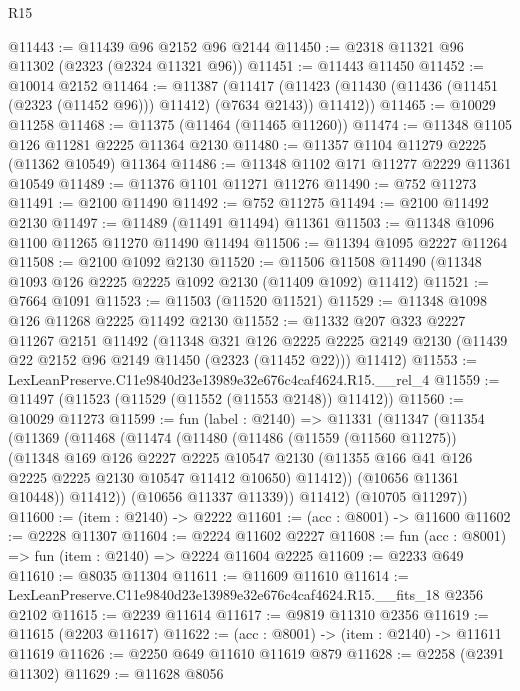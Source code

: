 \begin{lexlean}{R15}
\begin{coremodule}
@11443 := @11439 @96 @2152 @96 @2144
@11450 := @2318 @11321 @96 @11302 (@2323 (@2324 @11321 @96))
@11451 := @11443 @11450
@11452 := @10014 @2152
@11464 := @11387
    (@11417 (@11423 (@11430 (@11436 (@11451 (@2323 (@11452 @96))) @11412) (@7634 @2143)) @11412))
@11465 := @10029 @11258
@11468 := @11375 (@11464 (@11465 @11260))
@11474 := @11348 @1105 @126 @11281 @2225 @11364 @2130
@11480 := @11357 @1104 @11279 @2225 (@11362 @10549) @11364
@11486 := @11348 @1102 @171 @11277 @2229 @11361 @10549
@11489 := @11376 @1101 @11271 @11276
@11490 := @752 @11273
@11491 := @2100 @11490
@11492 := @752 @11275
@11494 := @2100 @11492 @2130
@11497 := @11489 (@11491 @11494) @11361
@11503 := @11348 @1096 @1100 @11265 @11270 @11490 @11494
@11506 := @11394 @1095 @2227 @11264
@11508 := @2100 @1092 @2130
@11520 := @11506 @11508 @11490 (@11348 @1093 @126 @2225 @2225 @1092 @2130 (@11409 @1092) @11412)
@11521 := @7664 @1091
@11523 := @11503 (@11520 @11521)
@11529 := @11348 @1098 @126 @11268 @2225 @11492 @2130
@11552 := @11332
    @207
    @323
    @2227
    @11267
    @2151
    @11492
    (@11348
      @321
      @126
      @2225
      @2225
      @2149
      @2130
      (@11439 @22 @2152 @96 @2149 @11450 (@2323 (@11452 @22)))
      @11412)
@11553 := LexLeanPreserve.C11e9840d23e13989e32e676c4caf4624.R15.__rel_4
@11559 := @11497 (@11523 (@11529 (@11552 (@11553 @2148)) @11412))
@11560 := @10029 @11273
@11599 := fun (label : @2140) =>
  @11331
    (@11347
      (@11354
        (@11369
          (@11468
            (@11474
              (@11480
                (@11486
                  (@11559 (@11560 @11275))
                  (@11348
                    @169
                    @126
                    @2227
                    @2225
                    @10547
                    @2130
                    (@11355 @166 @41 @126 @2225 @2225 @2130 @10547 @11412 @10650)
                    @11412))
                (@10656 @11361 @10448))
              @11412))
          (@10656 @11337 @11339))
        @11412)
      (@10705 @11297))
@11600 := (item : @2140) -> @2222
@11601 := (acc : @8001) -> @11600
@11602 := @2228 @11307
@11604 := @2224 @11602 @2227
@11608 := fun (acc : @8001) => fun (item : @2140) => @2224 @11604 @2225
@11609 := @2233 @649
@11610 := @8035 @11304
@11611 := @11609 @11610
@11614 := LexLeanPreserve.C11e9840d23e13989e32e676c4caf4624.R15.__fits_18 @2356 @2102
@11615 := @2239 @11614
@11617 := @9819 @11310 @2356
@11619 := @11615 (@2203 @11617)
@11622 := (acc : @8001) -> (item : @2140) -> @11611 @11619
@11626 := @2250 @649 @11610 @11619 @879
@11628 := @2258 (@2391 @11302)
@11629 := @11628 @8056

\end{coremodule}
\end{lexlean}
